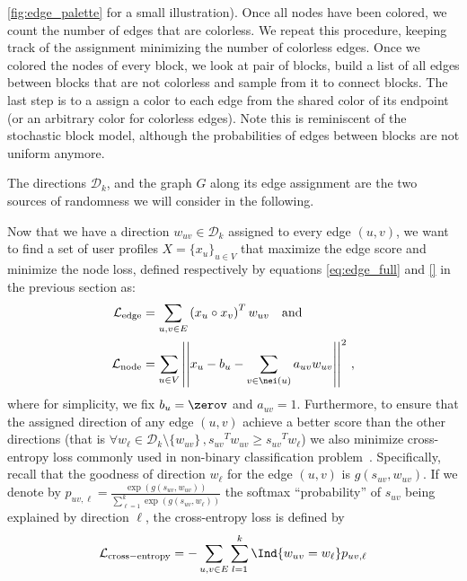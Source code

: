 \autoref{fig:edge_palette} for a small illustration). Once all nodes have been colored, we count the
number of edges that are colorless. We repeat this procedure, keeping track of the assignment
minimizing the number of colorless edges. Once we colored the nodes of every block, we look at pair
of blocks, build a list of all edges between blocks that are not colorless and sample from it to
connect blocks. The last step is to a assign a color to each edge from the shared color of its
endpoint (or an arbitrary color for colorless edges). Note this is reminiscent of the stochastic
block model, although the probabilities of edges between blocks are not uniform anymore.

The directions $\mathcal{D}_k$, and the graph $G$ along its edge assignment are the two sources of
randomness we will consider in the following.

\bigskip

Now that we have a direction $w_{uv} \in \mathcal{D}_k$ assigned to every edge $(u,v)$, we want to
find a set of user profiles $X=\{x_u\}_{u\in V}$ that maximize the edge score and minimize the node
loss, defined respectively by equations \eqref{eq:edge_full} and \eqref{} in the
previous section as: 
\begin{align*}
  \mathcal{L}_{\mathrm{edge}} &=
  \sum_{u,v \in E} \left(x_u \circ x_v\right)^T w_{uv} \quad \text{and} \\
  \mathcal{L}_{\mathrm{node}} &=
  \sum_{u\in V} \left|\left| x_u - b_u - \sum_{v \in \nei(u)} a_{uv} w_{uv} \right|\right|^2\,,
\end{align*}
where for simplicity, we fix $b_u = \zerov$ and $a_{uv} = 1$. Furthermore, to ensure that the
assigned direction of any edge $(u,v)$ achieve a better score than the other directions (that is
$\forall w_\ell \in \mathcal{D}_k \setminus \{w_{uv}\}\,, {s_{uv}}^T w_{uv} \geq  {s_{uv}}^T
w_\ell$) we also minimize cross-entropy loss commonly used in non-binary classification
problem~\autocite[Section 4.3.4]{PRML06}.  Specifically, recall that the goodness of direction
$w_\ell$ for the edge $(u,v)$ is $g(s_{uv}, w_{uv})$. If we denote by $p_{uv,\ell} = \frac{\exp
\left( g(s_{uv}, w_{uv}) \right)}{\sum_{\ell=1}^k \exp \left( g(s_{uv}, w_\ell) \right)}$ the
softmax \enquote{probability} of $s_{uv}$ being explained by direction $\ell$, the cross-entropy
loss is defined by
\begin{equation*}
  \mathcal{L}_{\mathrm{cross-entropy}} = -\sum_{u,v \in E} \sum_{l=1}^k
  \Ind{w_{uv} = w_\ell} p_{uv,\ell}
\end{equation*}


